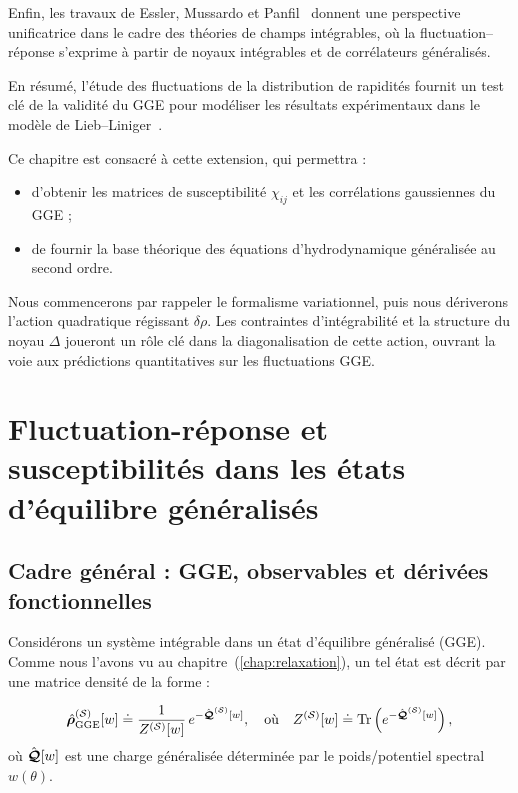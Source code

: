 {Enfin, les travaux de Essler, Mussardo et Panfil~\cite{Essler2015} donnent une perspective unificatrice dans le cadre des théories de champs intégrables, où la fluctuation–réponse s’exprime à partir de noyaux intégrables et de corrélateurs généralisés.
}

\medskip
En résumé, l’étude des fluctuations de la distribution de rapidités fournit un test clé de la validité du GGE pour modéliser les résultats expérimentaux dans le modèle de Lieb–Liniger~\cite{??, ??}.

\medskip
Ce chapitre est consacré à cette extension, qui permettra :
\begin{itemize}[label = $\bullet$]
  \item d’obtenir les matrices de susceptibilité \(\chi_{ij}\)  et les corrélations gaussiennes du GGE ;
  \item de fournir la base théorique des équations d’hydrodynamique généralisée au second ordre.
\end{itemize}

Nous commencerons par rappeler le formalisme variationnel, puis nous dériverons l’action quadratique régissant \(\delta\rho\).  Les contraintes d’intégrabilité et la structure du noyau \(\Delta\) joueront un rôle clé dans la diagonalisation de cette action, ouvrant la voie aux prédictions quantitatives sur les fluctuations GGE.


\section{Fluctuation-réponse et susceptibilités dans les états d’équilibre généralisés}

\subsection{Cadre général : GGE, observables et dérivées fonctionnelles}


Considérons un système intégrable dans un état d’équilibre généralisé (GGE). Comme nous l'avons vu au chapitre~(\ref{chap:relaxation}), un tel état est décrit par une matrice densité de la forme :

\begin{eqnarray*}
	\hat{\bm{\rho}}_{\mathrm{GGE}}^{(\mathcal{S})}[w] \doteq  \frac{1}{Z^{(\mathcal{S})}[w]}\, e^{-\hat{\bm{\mathcal{Q}}}^{(\mathcal{S})}[w]},\quad \text{où} \quad Z^{(\mathcal{S})}[w] \doteq \mathrm{Tr}\left(e^{-\hat{\bm{\mathcal{Q}}}^{(\mathcal{S})}[w]}\right),
\end{eqnarray*}
où \( \hat{\bm{\mathcal{Q}}}[w] \) est une charge généralisée déterminée par le poids/potentiel spectral \( w(\theta) \).\\

